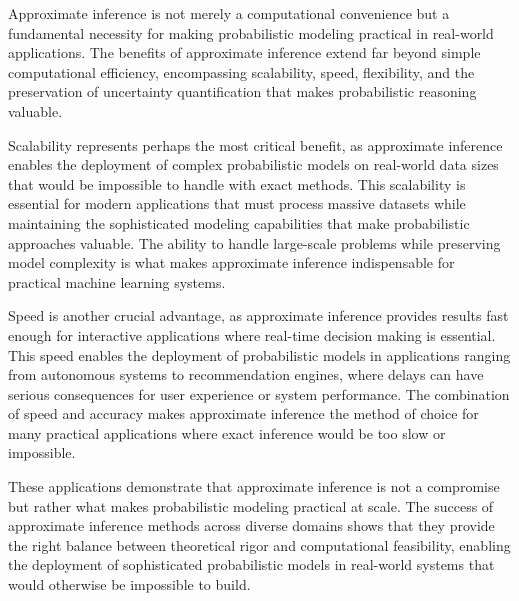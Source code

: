Approximate inference is not merely a computational convenience but a fundamental necessity for making probabilistic modeling practical in real-world applications. The benefits of approximate inference extend far beyond simple computational efficiency, encompassing scalability, speed, flexibility, and the preservation of uncertainty quantification that makes probabilistic reasoning valuable.

Scalability represents perhaps the most critical benefit, as approximate inference enables the deployment of complex probabilistic models on real-world data sizes that would be impossible to handle with exact methods. This scalability is essential for modern applications that must process massive datasets while maintaining the sophisticated modeling capabilities that make probabilistic approaches valuable. The ability to handle large-scale problems while preserving model complexity is what makes approximate inference indispensable for practical machine learning systems.

Speed is another crucial advantage, as approximate inference provides results fast enough for interactive applications where real-time decision making is essential. This speed enables the deployment of probabilistic models in applications ranging from autonomous systems to recommendation engines, where delays can have serious consequences for user experience or system performance. The combination of speed and accuracy makes approximate inference the method of choice for many practical applications where exact inference would be too slow or impossible.

These applications demonstrate that approximate inference is not a compromise but rather what makes probabilistic modeling practical at scale. The success of approximate inference methods across diverse domains shows that they provide the right balance between theoretical rigor and computational feasibility, enabling the deployment of sophisticated probabilistic models in real-world systems that would otherwise be impossible to build.

